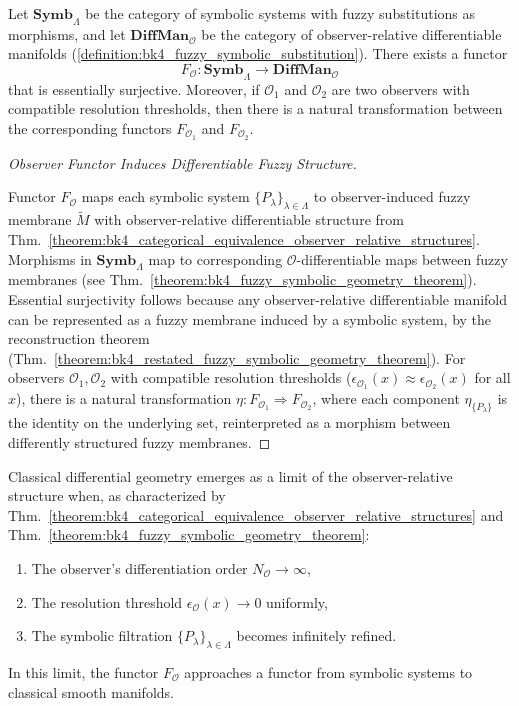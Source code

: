 \begin{theorem} \label{theorem:bk4_categorical_equivalence_observer_relative_structures}
Let $\mathbf{Symb}_\Lambda$ be the category of symbolic systems with fuzzy substitutions as morphisms, and let $\mathbf{DiffMan}_\mathcal{O}$ be the category of observer-relative differentiable manifolds (\ref{definition:bk4_fuzzy_symbolic_substitution}). There exists a functor
\[
F_\mathcal{O}: \mathbf{Symb}_\Lambda \to \mathbf{DiffMan}_\mathcal{O}
\]
that is essentially surjective. Moreover, if $\mathcal{O}_1$ and $\mathcal{O}_2$ are two observers with compatible resolution thresholds, then there is a natural transformation between the corresponding functors $F_{\mathcal{O}_1}$ and $F_{\mathcal{O}_2}$.
\end{theorem}
\begin{proof}[Observer Functor Induces Differentiable Fuzzy Structure]
\label{proof:bk4_observer_functor_induced_structure}
\leavevmode

Functor $F_\mathcal{O}$ maps each symbolic system
$\{P_\lambda\}_{\lambda \in \Lambda}$ to observer-induced fuzzy membrane
$\tilde{M}$ with observer-relative differentiable structure from
Thm.~\ref{theorem:bk4_categorical_equivalence_observer_relative_structures}.
Morphisms in $\mathbf{Symb}_\Lambda$ map to corresponding
$\mathcal{O}$-differentiable maps between fuzzy membranes
(see Thm.~\ref{theorem:bk4_fuzzy_symbolic_geometry_theorem}).
Essential surjectivity follows because any observer-relative differentiable
manifold can be represented as a fuzzy membrane induced by a symbolic system,
by the reconstruction theorem
(Thm.~\ref{theorem:bk4_restated_fuzzy_symbolic_geometry_theorem}).
For observers $\mathcal{O}_1,\mathcal{O}_2$ with compatible resolution
thresholds
($\epsilon_{\mathcal{O}_1}(x) \approx \epsilon_{\mathcal{O}_2}(x)$ for all
$x$), there is a natural transformation
$\eta: F_{\mathcal{O}_1} \Rightarrow F_{\mathcal{O}_2}$, where each component
$\eta_{\{P_\lambda\}}$ is the identity on the underlying set, reinterpreted as
a morphism between differently structured fuzzy membranes.
\end{proof}
\begin{corollary} \label{corollary:bk4_emergence_of_classical_ge}
Classical differential geometry emerges as a limit of the observer-relative structure when, as characterized by Thm.~\ref{theorem:bk4_categorical_equivalence_observer_relative_structures} and Thm.~\ref{theorem:bk4_fuzzy_symbolic_geometry_theorem}:
\begin{enumerate}
    \item The observer's differentiation order $N_\mathcal{O} \to \infty$,
    \item The resolution threshold $\epsilon_\mathcal{O}(x) \to 0$ uniformly,
    \item The symbolic filtration $\{P_\lambda\}_{\lambda \in \Lambda}$ becomes infinitely refined.
\end{enumerate}
In this limit, the functor $F_\mathcal{O}$ approaches a functor from symbolic systems to classical smooth manifolds.
\end{corollary}

